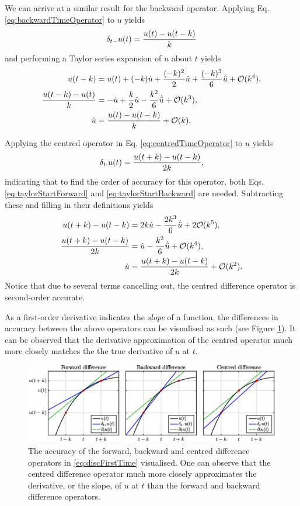 We can arrive at a similar result for the backward operator. Applying Eq. \eqref{eq:backwardTimeOperator} to $u$ yields
\begin{equation}
    \delta_{t-} u(t) = \frac{u(t) - u(t-k)}{k}
\end{equation}
and performing a Taylor series expansion of $u$ about $t$ yields
\begin{align}
    u(t-k) &= u(t) + (-k) \dot u + \frac{(-k)^2}{2} \ddot u +\frac{(-k)^3}{6}\dot{\ddot{u}} + \mathcal{O}(k^4),\label{eq:taylorStartBackward}\\
    \frac{u(t-k) - u(t)}{k} &= -\dot u + \frac{k}{2} \ddot u - \frac{k^2}{6}\dot{\ddot{u}} + \mathcal{O}(k^3),\nonumber\\
    \dot u &= \frac{u(t) - u(t-k)}{k} + \mathcal{O}(k).
\end{align}

Applying the centred operator in Eq. \eqref{eq:centredTimeOperator} to $u$ yields
\begin{equation}
    \delta_{t\cdot} u(t) = \frac{u(t+k) - u(t-k)}{2k},
\end{equation}
indicating that to find the order of accuracy for this operator, both Eqs. \eqref{eq:taylorStartForward} and \eqref{eq:taylorStartBackward} are needed. Subtracting these and filling in their definitions yields
\begin{align}
    u(t+k) - u(t-k) &= 2k\dot u - \frac{2k^3}{6}\dot{\ddot{u}} + 2\mathcal{O}(k^5),\\
    \frac{u(t+k) - u(t-k)}{2k} &= \dot u - \frac{k^2}{6}\dot{\ddot{u}} + \mathcal{O}(k^4),\\
    \dot u &= \frac{u(t+k) - u(t-k)}{2k} + \mathcal{O}(k^2).
\end{align}
Notice that due to several terms cancelling out, the centred difference operator is second-order accurate. 

As a first-order derivative indicates the \textit{slope} of a function, the differences in accuracy between the above operators can be visualised as such (see Figure \ref{fig:taylor}). It can be observed that the derivative approximation of the centred operator much more closely matches the the true derivative of $u$ at $t$.

\begin{figure}[h]
    \includegraphics[width=\textwidth]{figures/fdtd/taylor.eps}
    \caption{\label{fig:taylor} The accuracy of the forward, backward and centred difference operators in \eqref{eq:discFirstTime} visualised. One can observe that the centred difference operator much more closely approximates the derivative, or the slope, of $u$ at $t$ than the forward and backward difference operators.}
\end{figure}

